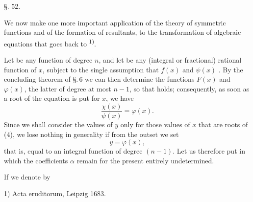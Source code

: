 
\begin{center}
§. 52.

\end{center}

We now make one more important application of the theory of symmetric functions and of the formation of resultants, to the transformation of algebraic equations that goes back to \textsuperscript{1)}.

Let
be any function of degree $n$, and let
be any (integral or fractional) rational function of $x$, subject to the single assumption that $f(x)$ and $\psi(x)$ . By the concluding theorem of \S.\,6 we can then determine the functions $F(x)$ and $\varphi(x)$, the latter of degree at most $n-1$, so that
holds; consequently, as soon as a root of the equation
is put for $x$, we have
\[
\frac{\chi(x)}{\psi(x)} = \varphi(x). %
\]
Since we shall consider the values of $y$ only for those values of $x$ that are roots of (4), we lose nothing in generality if from the outset we set
\[
y = \varphi(x),
\]
that is, equal to an integral function of degree $(n-1)$. Let us therefore put
in which the coefficients $\alpha$ remain for the present entirely undetermined.

If we denote by

\par\smallskip
{\small 1) Acta eruditorum, Leipzig 1683.}\par
